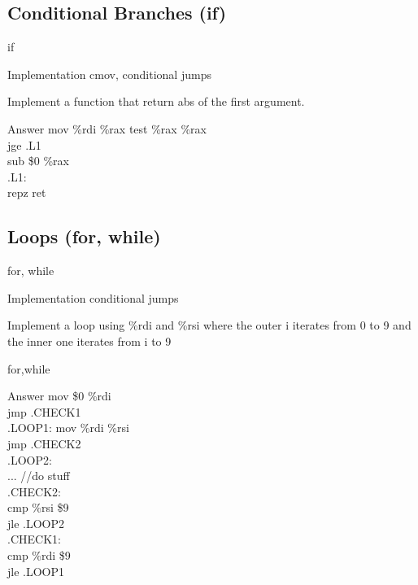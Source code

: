 \documentclass{beamer}
\begin{document}
        \subsection{Conditional Branches (if)}
            \begin{frame}{if}
                \begin{block}{Implementation}
                    cmov, conditional jumps
                \end{block}
                \begin{example}
                    Implement a function that return abs of the first argument.
                \end{example}
                \begin{block}{Answer}
                    mov \%rdi \%rax
                    test \%rax \%rax\\
                    jge .L1\\
                    sub \$0 \%rax\\
                    .L1:\\
                      repz ret
                \end{block}
            \end{frame}
        \subsection{Loops (for, while)}
            \begin{frame}{for, while}
                \begin{block}{Implementation}
                    conditional jumps
                \end{block}
                \begin{example}
                    Implement a loop using \%rdi and \%rsi where the outer i iterates from 0 to 9 and the inner one iterates from i to 9 
                \end{example}
            \end{frame}
            \begin{frame}{for,while}
                \begin{block}{Answer}
                    mov \$0 \%rdi\\
                    jmp .CHECK1\\
                    .LOOP1:
                    mov \%rdi \%rsi\\
                    jmp .CHECK2\\
                    .LOOP2:\\
                    ... //do stuff\\
                    .CHECK2:\\
                    cmp \%rsi \$9\\
                    jle .LOOP2\\
                    .CHECK1:\\
                    cmp \%rdi \$9\\
                    jle .LOOP1
                \end{block}
            \end{frame}
\end{document}
